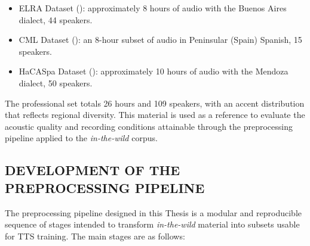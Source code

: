 \begin{itemize}
\item ELRA Dataset (\cite{google-arg}): approximately 8 hours of audio with the Buenos Aires dialect, 44 speakers.
\item CML Dataset (\cite{cml-dataset}): an 8-hour subset of audio in Peninsular (Spain) Spanish, 15 speakers.
\item HaCASpa Dataset (\cite{dataset_hamburg}): approximately 10 hours of audio with the Mendoza dialect, 50 speakers.
\end{itemize}

The professional set totals 26 hours and 109 speakers, with an accent distribution that reflects regional diversity. This material is used as a reference to evaluate the acoustic quality and recording conditions attainable through the preprocessing pipeline applied to the \emph{in-the-wild} corpus.

\subsection{DEVELOPMENT OF THE PREPROCESSING PIPELINE}
\label{sec:pipeline-desarrollo}

The preprocessing pipeline designed in this Thesis is a modular and reproducible sequence of stages intended to transform \emph{in-the-wild} material into subsets usable for TTS training. The main stages are as follows:

